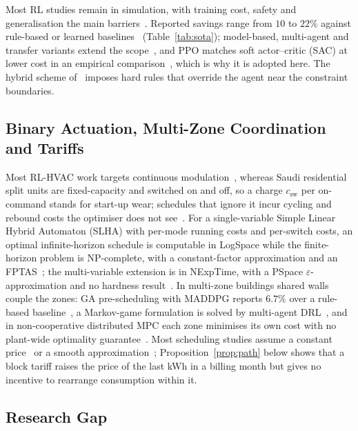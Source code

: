 \documentclass[3p,twocolumn,number]{elsarticle}
\newcommand{\csw}{c_{\mathrm{sw}}}
\begin{document}
Most RL studies remain in simulation, with training cost, safety and generalisation the main barriers~\cite{WangHong2020}. Reported savings range from $10$ to $22\%$ against rule-based or learned baselines~\cite{Azuatalam2020,Biemann2021,Du2021b,Du2021a} (Table~\ref{tab:sota}); model-based, multi-agent and transfer variants extend the scope~\cite{Ding2024,Liu2024,Hou2024}, and PPO matches soft actor--critic (SAC) at lower cost in an empirical comparison~\cite{Manjavacas2024}, which is why it is adopted here. The hybrid scheme of~\cite{Xu2025} imposes hard rules that override the agent near the constraint boundaries.

\subsection{Binary Actuation, Multi-Zone Coordination and Tariffs}

Most RL-HVAC work targets continuous modulation~\cite{Wang2024DRL}, whereas Saudi residential split units are fixed-capacity and switched on and off, so a charge $\csw$ per on-command stands for start-up wear; schedules that ignore it incur cycling and rebound costs the optimiser does not see~\cite{Faddel2023}. For a single-variable Simple Linear Hybrid Automaton (SLHA) with per-mode running costs and per-switch costs, an optimal infinite-horizon schedule is computable in LogSpace while the finite-horizon problem is NP-complete, with a constant-factor approximation and an FPTAS~\cite{Mousa2016}; the multi-variable extension is in NExpTime, with a PSpace $\varepsilon$-approximation and no hardness result~\cite{Mousa2017}. In multi-zone buildings shared walls couple the zones: GA pre-scheduling with MADDPG reports $6.7\%$ over a rule-based baseline~\cite{Xue2025}, a Markov-game formulation is solved by multi-agent DRL~\cite{Yu2021}, and in non-cooperative distributed MPC each zone minimises its own cost with no plant-wide optimality guarantee~\cite{Scattolini2009}. Most scheduling studies assume a constant price~\cite{ElMakroum2023} or a smooth approximation~\cite{Risbeck2017}; Proposition~\ref{prop:path} below shows that a block tariff raises the price of the last kWh in a billing month but gives no incentive to rearrange consumption within it.

\subsection{Research Gap}
\label{subsec:gap}
 
\end{document}
